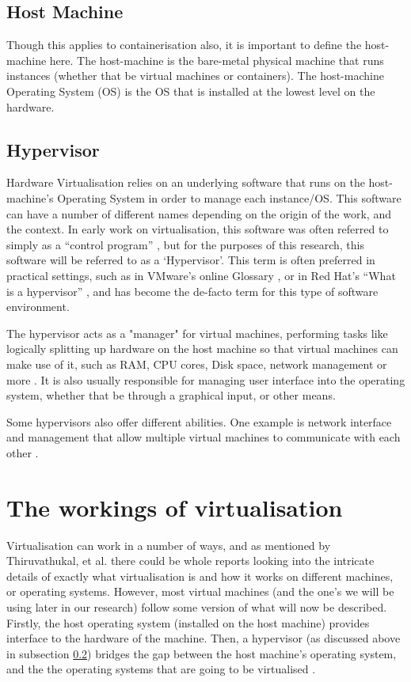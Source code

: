 \subsection{Host Machine}
Though this applies to containerisation also, it is important to define the host-machine here. The host-machine is the bare-metal physical machine that runs instances (whether that be virtual machines or containers). The host-machine Operating System (OS) is the OS that is installed at the lowest level on the hardware.

\subsection{Hypervisor}
\label{subsec:hypervisor}
Hardware Virtualisation relies on an underlying software that runs on the host-machine's Operating System in order to manage each instance/OS. This software can have a number of different names depending on the origin of the work, and the context. In early work on virtualisation, this software was often referred to simply as a ``control program'' \citep{creasy1981}, but for the purposes of this research, this software will be referred to as a `Hypervisor'. This term is often preferred in practical settings, such as in VMware's online Glossary \citep{vmwareHypervisor}, or in Red Hat's ``What is a hypervisor'' \citep{redhat2021}, and has become the de-facto term for this type of software environment.

The hypervisor acts as a "manager" for virtual machines, performing tasks like logically splitting up hardware on the host machine so that virtual machines can make use of it, such as RAM, CPU cores, Disk space, network management or more \citep{fragni2010evaluating}. It is also usually responsible for managing user interface into the operating system, whether that be through a graphical input, or other means.

Some hypervisors also offer different abilities. One example is network interface and management that allow multiple virtual machines to communicate with each other \citep{VMwareNetChange}.

\section{The workings of virtualisation}
Virtualisation can work in a number of ways, and as mentioned by Thiruvathukal, et al. there could be whole reports looking into the intricate details of exactly what virtualisation is \citep{VMwareWorking} and how it works on different machines, or operating systems. However, most virtual machines (and the one's we will be using later in our research) follow some version of what will now be described. Firstly, the host operating system (installed on the host machine) provides interface to the hardware of the machine. Then, a hypervisor (as discussed above in subsection \ref{subsec:hypervisor}) bridges the gap between the host machine's operating system, and the the operating systems that are going to be virtualised \citep{fragni2010evaluating}.

